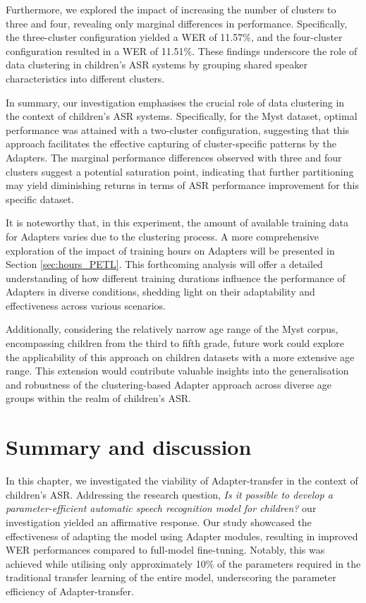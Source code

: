 Furthermore, we explored the impact of increasing the number of clusters to three and four, revealing only marginal differences in performance. Specifically, the three-cluster configuration yielded a \ac{WER} of 11.57\%, and the four-cluster configuration resulted in a \ac{WER} of 11.51\%. These findings underscore the role of data clustering in children's \ac{ASR} systems by grouping shared speaker characteristics into different clusters.


In summary, our investigation emphasises the crucial role of data clustering in the context of children's \ac{ASR} systems. Specifically, for the Myst dataset, optimal performance was attained with a two-cluster configuration, suggesting that this approach facilitates the effective capturing of cluster-specific patterns by the Adapters. The marginal performance differences observed with three and four clusters suggest a potential saturation point, indicating that further partitioning may yield diminishing returns in terms of \ac{ASR} performance improvement for this specific dataset.

It is noteworthy that, in this experiment, the amount of available training data for Adapters varies due to the clustering process. A more comprehensive exploration of the impact of training hours on Adapters will be presented in Section \ref{sec:hours_PETL}. This forthcoming analysis will offer a detailed understanding of how different training durations influence the performance of Adapters in diverse conditions, shedding light on their adaptability and effectiveness across various scenarios.

Additionally, considering the relatively narrow age range of the Myst corpus, encompassing children from the third to fifth grade, future work could explore the applicability of this approach on children datasets with a more extensive age range. This extension would contribute valuable insights into the generalisation and robustness of the clustering-based Adapter approach across diverse age groups within the realm of children's \ac{ASR}.

    
\section{Summary and discussion}
In this chapter, we investigated the viability of Adapter-transfer in the context of children's \ac{ASR}. Addressing the research question, \textit{Is it possible to develop a parameter-efficient automatic speech recognition model for children?} our investigation yielded an affirmative response. Our study showcased the effectiveness of adapting the model using Adapter modules, resulting in improved \ac{WER} performances compared to full-model fine-tuning. Notably, this was achieved while utilising only approximately 10\% of the parameters required in the traditional transfer learning of the entire model, underscoring the parameter efficiency of Adapter-transfer.
 
